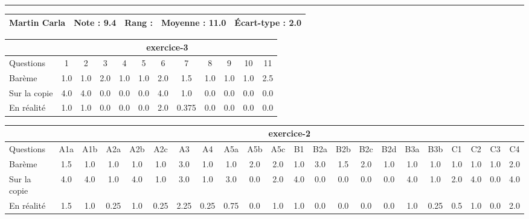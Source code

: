 \documentclass[a4paper, landscape, 10pt]{article}
\begin{document}
\begin{minipage}{\textwidth}
  \end{minipage}
  \vspace{0.3cm}
  \hrule
  \vspace{0.3cm}

  \begin{minipage}{\textwidth}
    { \bf
    \begin{tabular}{|c|*{4}{c|}}
    \hline
      Martin  Carla & Note : 9.4 & Rang :  & Moyenne : 11.0 & \'Ecart-type : 2.0 \\
    \hline
    \end{tabular}
    }
    
      \begin{tabular}{|l|*{ 11 }{c|}}
        \hline
        & \multicolumn{ 11 }{c|}{ exercice-3 } \\
        \hline
        Questions & 1&2&3&4&5&6&7&8&9&10&11 \\
        \hline
        Barème & 1.0&1.0&2.0&1.0&1.0&2.0&1.5&1.0&1.0&1.0&2.5 \\
        \hline
        Sur la copie & 4.0&4.0&0.0&0.0&0.0&4.0&1.0&0.0&0.0&0.0&0.0 \\
        \hline
        En réalité & 1.0&1.0&0.0&0.0&0.0&2.0&0.375&0.0&0.0&0.0&0.0 \\
        \hline
      \end{tabular}
    
      \begin{tabular}{|l|*{ 21 }{c|}}
        \hline
        & \multicolumn{ 21 }{c|}{ exercice-2 } \\
        \hline
        Questions & A1a&A1b&A2a&A2b&A2c&A3&A4&A5a&A5b&A5c&B1&B2a&B2b&B2c&B2d&B3a&B3b&C1&C2&C3&C4 \\
        \hline
        Barème & 1.5&1.0&1.0&1.0&1.0&3.0&1.0&1.0&2.0&2.0&1.0&3.0&1.5&2.0&1.0&1.0&1.0&1.0&1.0&1.0&2.0 \\
        \hline
        Sur la copie & 4.0&4.0&1.0&4.0&1.0&3.0&1.0&3.0&0.0&2.0&4.0&0.0&0.0&0.0&0.0&4.0&1.0&2.0&4.0&0.0&4.0 \\
        \hline
        En réalité & 1.5&1.0&0.25&1.0&0.25&2.25&0.25&0.75&0.0&1.0&1.0&0.0&0.0&0.0&0.0&1.0&0.25&0.5&1.0&0.0&2.0 \\
        \hline
      \end{tabular}
    

\end{minipage}
\end{document}
